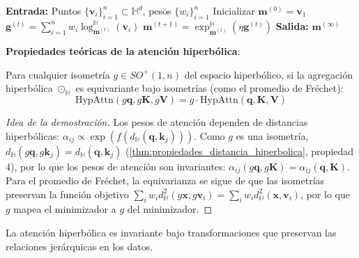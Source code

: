 \begin{algorithm}[H]
\caption{Promedio de Fréchet Hiperbólico}
\begin{algorithmic}[1]
    \State \textbf{Entrada:} Puntos $\{\mathbf{v}_i\}_{i=1}^n \subset \mathbb{H}^d$, pesos $\{w_i\}_{i=1}^n$
    \State Inicializar $\mathbf{m}^{(0)} = \mathbf{v}_1$
        \State $\mathbf{g}^{(t)} = \sum_{i=1}^n w_i \log_{\mathbf{m}^{(t)}}^{\mathbb{H}}(\mathbf{v}_i)$
        \State $\mathbf{m}^{(t+1)} = \exp_{\mathbf{m}^{(t)}}^{\mathbb{H}}(\eta \mathbf{g}^{(t)})$
    \EndFor
    \State \textbf{Salida:} $\mathbf{m}^{(\infty)}$
\end{algorithmic}
\end{algorithm}

\textbf{Propiedades teóricas de la atención hiperbólica}:

\begin{proposition}\label{prop:equivarianza_atencion_hiperbolica}
Para cualquier isometría $g \in SO^+(1,n)$ del espacio hiperbólico, si la agregación hiperbólica $\odot_{\mathbb{H}}$ es equivariante bajo isometrías (como el promedio de Fréchet):
\begin{equation}
\text{HypAttn}(g\mathbf{q}, g\mathbf{K}, g\mathbf{V}) = g \cdot \text{HypAttn}(\mathbf{q}, \mathbf{K}, \mathbf{V})
\end{equation}
\end{proposition}

\begin{proof}[Idea de la demostración]
Los pesos de atención dependen de distancias hiperbólicas: $\alpha_{ij} \propto \exp(f(d_{\mathbb{H}}(\mathbf{q}, \mathbf{k}_j)))$. Como $g$ es una isometría, $d_{\mathbb{H}}(g\mathbf{q}, g\mathbf{k}_j) = d_{\mathbb{H}}(\mathbf{q}, \mathbf{k}_j)$ (\autoref{thm:propiedades_distancia_hiperbolica}, propiedad 4), por lo que los pesos de atención son invariantes: $\alpha_{ij}(g\mathbf{q}, g\mathbf{K}) = \alpha_{ij}(\mathbf{q}, \mathbf{K})$. Para el promedio de Fréchet, la equivarianza se sigue de que las isometrías preservan la función objetivo $\sum_i w_i d_{\mathbb{H}}^2(g\mathbf{x}, g\mathbf{v}_i) = \sum_i w_i d_{\mathbb{H}}^2(\mathbf{x}, \mathbf{v}_i)$, por lo que $g$ mapea el minimizador a $g$ del minimizador.
\end{proof}

\begin{corollary}\label{cor:invarianza_similaridad}
La atención hiperbólica es invariante bajo transformaciones que preservan las relaciones jerárquicas en los datos.
\end{corollary}

